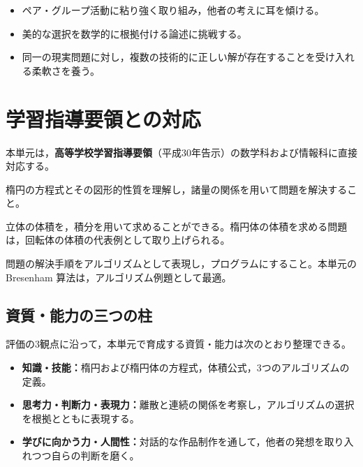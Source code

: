 \documentclass[12pt,a4paper]{scrartcl}
\newcommand{\acc}[1]{\textcolor{accent}{\textbf{#1}}}
\begin{document}
\begin{itemize}[leftmargin=1.3em,itemsep=0.15em,topsep=0.3em]
  \item ペア・グループ活動に粘り強く取り組み，他者の考えに耳を傾ける。
  \item 美的な選択を数学的に根拠付ける論述に挑戦する。
  \item 同一の現実問題に対し，複数の技術的に正しい解が存在することを受け入れる柔軟さを養う。
\end{itemize}

\section{学習指導要領との対応}

本単元は，\acc{高等学校学習指導要領}（平成30年告示）の数学科および情報科に直接対応する。

\begin{youryou}
楕円の方程式とその図形的性質を理解し，諸量の関係を用いて問題を解決すること。
\end{youryou}

\begin{youryou}
立体の体積を，積分を用いて求めることができる。楕円体の体積を求める問題は，回転体の体積の代表例として取り上げられる。
\end{youryou}

\begin{youryou}
問題の解決手順をアルゴリズムとして表現し，プログラムにすること。本単元の Bresenham 算法は，アルゴリズム例題として最適。
\end{youryou}

\subsection{資質・能力の三つの柱}

評価の3観点に沿って，本単元で育成する資質・能力は次のとおり整理できる。

\begin{itemize}[leftmargin=1.3em,itemsep=0.15em,topsep=0.3em]
  \item \acc{知識・技能：}楕円および楕円体の方程式，体積公式，3つのアルゴリズムの定義。
  \item \acc{思考力・判断力・表現力：}離散と連続の関係を考察し，アルゴリズムの選択を根拠とともに表現する。
  \item \acc{学びに向かう力・人間性：}対話的な作品制作を通して，他者の発想を取り入れつつ自らの判断を磨く。
\end{itemize}
\end{document}
